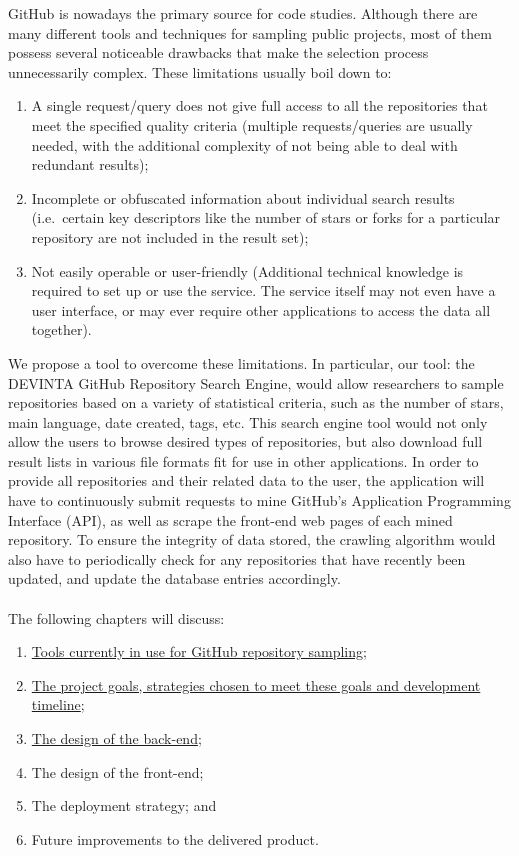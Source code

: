 GitHub is nowadays the primary source for code studies.
Although there are many different tools and techniques for sampling public projects, most of them possess several noticeable drawbacks that make the selection process unnecessarily complex.
These limitations usually boil down to:
\begin{enumerate}
    \item A single request/query does not give full access to all the repositories that meet the specified quality criteria (multiple requests/queries are usually needed, with the additional complexity of not being able to deal with redundant results);
    \item Incomplete or obfuscated information about individual search results (i.e.\ certain key descriptors like the number of stars or forks for a particular repository are not included in the result set);
    \item Not easily operable or user-friendly (Additional technical knowledge is required to set up or use the service. The service itself may not even have a user interface, or may ever require other applications to access the data all together).
\end{enumerate}

\newpage

We propose a tool to overcome these limitations.
In particular, our tool: the DEVINTA GitHub Repository Search Engine, would allow researchers to sample repositories based on a variety of statistical criteria, such as the number of stars, main language, date created, tags, etc.
This search engine tool would not only allow the users to browse desired types of repositories, but also download full result lists in various file formats fit for use in other applications.
In order to provide all repositories and their related data to the user, the application will have to continuously submit requests to mine GitHub's Application Programming Interface (API), as well as scrape the front-end web pages of each mined repository.
To ensure the integrity of data stored, the crawling algorithm would also have to periodically check for any repositories that have recently been updated, and update the database entries accordingly.
\\\\
\noindent
The following chapters will discuss:
\begin{enumerate}
    \item \hyperref[ch:2]{Tools currently in use for GitHub repository sampling};
    \item \hyperref[ch:3]{The project goals, strategies chosen to meet these goals and development timeline};
    \item \hyperref[ch:4]{The design of the back-end};
    \item The design of the front-end;
    \item The deployment strategy; and
    \item Future improvements to the delivered product.
\end{enumerate}